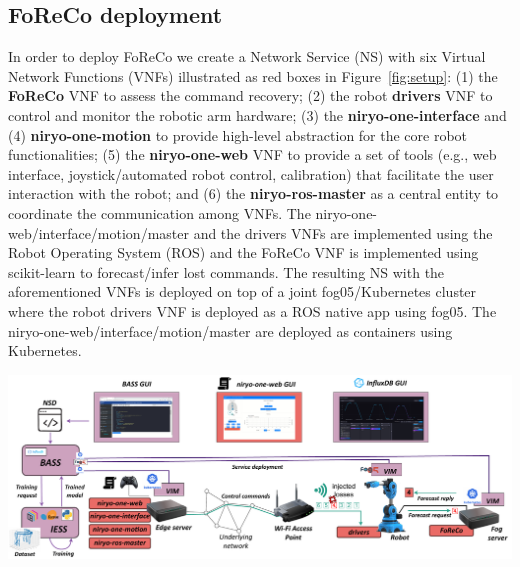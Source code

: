 \documentclass[a0,portrait]{a0poster}
\begin{document}
\begin{multicols}{2}

\section*{FoReCo deployment}
\label{sec:deep}

In order to deploy FoReCo we create
a Network Service (NS) with six
Virtual Network Functions (VNFs)
illustrated as red boxes
in Figure~\ref{fig:setup}:
(1) the \textbf{FoReCo} VNF to assess the command
recovery;
(2) the robot \textbf{drivers} VNF
to control and monitor the robotic arm hardware;
(3) the \textbf{niryo-one-interface} and (4) \textbf{niryo-one-motion} to provide high-level abstraction for the core robot functionalities; (5) the \textbf{niryo-one-web} VNF to provide a set of tools (e.g., web interface, joystick/automated robot control, calibration) that facilitate the user interaction with the robot; and
(6) the \textbf{niryo-ros-master} as a central
entity to coordinate the communication among VNFs.
The niryo-one-web/interface/motion/master and the
drivers VNFs are implemented using
the Robot Operating System
(ROS)%
and the FoReCo VNF is implemented
using 
scikit-learn%
to forecast/infer lost commands.
The resulting NS with the aforementioned VNFs is deployed on top of a joint fog05/Kubernetes cluster where the robot drivers VNF is deployed as a ROS native app using fog05. The niryo-one-web/interface/motion/master are deployed as containers using Kubernetes.


\begin{center}\vspace{1cm}
	\includegraphics[width=\linewidth] {figures/experimental-setup.pdf}
    \label{fig:setup}
\end{center}\vspace{1cm}


\end{multicols}
\end{document}
